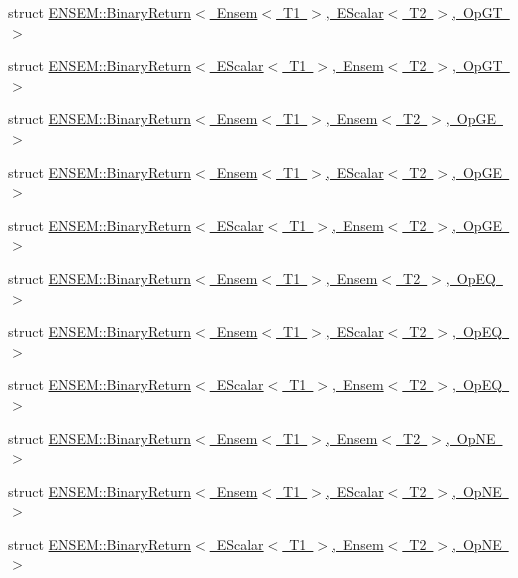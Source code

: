 \begin{DoxyCompactItemize}
\item 
struct \mbox{\hyperlink{structENSEM_1_1BinaryReturn_3_01Ensem_3_01T1_01_4_00_01EScalar_3_01T2_01_4_00_01OpGT_01_4}{E\+N\+S\+E\+M\+::\+Binary\+Return$<$ Ensem$<$ T1 $>$, E\+Scalar$<$ T2 $>$, Op\+G\+T $>$}}
\item 
struct \mbox{\hyperlink{structENSEM_1_1BinaryReturn_3_01EScalar_3_01T1_01_4_00_01Ensem_3_01T2_01_4_00_01OpGT_01_4}{E\+N\+S\+E\+M\+::\+Binary\+Return$<$ E\+Scalar$<$ T1 $>$, Ensem$<$ T2 $>$, Op\+G\+T $>$}}
\item 
struct \mbox{\hyperlink{structENSEM_1_1BinaryReturn_3_01Ensem_3_01T1_01_4_00_01Ensem_3_01T2_01_4_00_01OpGE_01_4}{E\+N\+S\+E\+M\+::\+Binary\+Return$<$ Ensem$<$ T1 $>$, Ensem$<$ T2 $>$, Op\+G\+E $>$}}
\item 
struct \mbox{\hyperlink{structENSEM_1_1BinaryReturn_3_01Ensem_3_01T1_01_4_00_01EScalar_3_01T2_01_4_00_01OpGE_01_4}{E\+N\+S\+E\+M\+::\+Binary\+Return$<$ Ensem$<$ T1 $>$, E\+Scalar$<$ T2 $>$, Op\+G\+E $>$}}
\item 
struct \mbox{\hyperlink{structENSEM_1_1BinaryReturn_3_01EScalar_3_01T1_01_4_00_01Ensem_3_01T2_01_4_00_01OpGE_01_4}{E\+N\+S\+E\+M\+::\+Binary\+Return$<$ E\+Scalar$<$ T1 $>$, Ensem$<$ T2 $>$, Op\+G\+E $>$}}
\item 
struct \mbox{\hyperlink{structENSEM_1_1BinaryReturn_3_01Ensem_3_01T1_01_4_00_01Ensem_3_01T2_01_4_00_01OpEQ_01_4}{E\+N\+S\+E\+M\+::\+Binary\+Return$<$ Ensem$<$ T1 $>$, Ensem$<$ T2 $>$, Op\+E\+Q $>$}}
\item 
struct \mbox{\hyperlink{structENSEM_1_1BinaryReturn_3_01Ensem_3_01T1_01_4_00_01EScalar_3_01T2_01_4_00_01OpEQ_01_4}{E\+N\+S\+E\+M\+::\+Binary\+Return$<$ Ensem$<$ T1 $>$, E\+Scalar$<$ T2 $>$, Op\+E\+Q $>$}}
\item 
struct \mbox{\hyperlink{structENSEM_1_1BinaryReturn_3_01EScalar_3_01T1_01_4_00_01Ensem_3_01T2_01_4_00_01OpEQ_01_4}{E\+N\+S\+E\+M\+::\+Binary\+Return$<$ E\+Scalar$<$ T1 $>$, Ensem$<$ T2 $>$, Op\+E\+Q $>$}}
\item 
struct \mbox{\hyperlink{structENSEM_1_1BinaryReturn_3_01Ensem_3_01T1_01_4_00_01Ensem_3_01T2_01_4_00_01OpNE_01_4}{E\+N\+S\+E\+M\+::\+Binary\+Return$<$ Ensem$<$ T1 $>$, Ensem$<$ T2 $>$, Op\+N\+E $>$}}
\item 
struct \mbox{\hyperlink{structENSEM_1_1BinaryReturn_3_01Ensem_3_01T1_01_4_00_01EScalar_3_01T2_01_4_00_01OpNE_01_4}{E\+N\+S\+E\+M\+::\+Binary\+Return$<$ Ensem$<$ T1 $>$, E\+Scalar$<$ T2 $>$, Op\+N\+E $>$}}
\item 
struct \mbox{\hyperlink{structENSEM_1_1BinaryReturn_3_01EScalar_3_01T1_01_4_00_01Ensem_3_01T2_01_4_00_01OpNE_01_4}{E\+N\+S\+E\+M\+::\+Binary\+Return$<$ E\+Scalar$<$ T1 $>$, Ensem$<$ T2 $>$, Op\+N\+E $>$}}

\end{DoxyCompactItemize}
